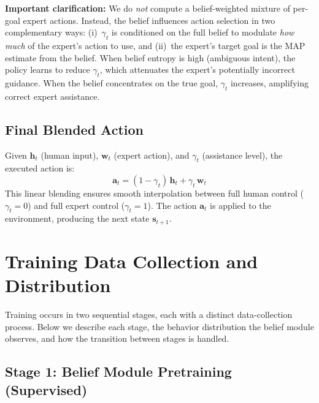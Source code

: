 \documentclass[11pt]{article}
\newcommand{\hvec}{\mathbf{h}_t}
\newcommand{\wvec}{\mathbf{w}_t}
\newcommand{\avec}{\mathbf{a}_t}
\begin{document}
\noindent\textbf{Important clarification:} We do \emph{not} compute a belief-weighted mixture of per-goal expert actions.
Instead, the belief influences action selection in two complementary ways:
(i)~$\gamma_t$ is conditioned on the full belief to modulate \emph{how much} of the expert's action to use, and
(ii)~the expert's target goal is the MAP estimate from the belief.
When belief entropy is high (ambiguous intent), the policy learns to reduce $\gamma_t$, which attenuates the expert's potentially incorrect guidance.
When the belief concentrates on the true goal, $\gamma_t$ increases, amplifying correct expert assistance.


\subsection{Final Blended Action}

Given $\hvec$ (human input), $\wvec$ (expert action), and $\gamma_t$ (assistance level), the executed action is:
\begin{equation}
    \avec = (1 - \gamma_t)\,\hvec + \gamma_t\,\wvec
    \label{eq:blend}
\end{equation}
This linear blending ensures smooth interpolation between full human control ($\gamma_t = 0$) and full expert control ($\gamma_t = 1$).
The action $\avec$ is applied to the environment, producing the next state $\mathbf{s}_{t+1}$.


\section{Training Data Collection and Distribution}
\label{sec:training-data}

Training occurs in two sequential stages, each with a distinct data-collection process.
Below we describe each stage, the behavior distribution the belief module observes, and how the transition between stages is handled.

\subsection{Stage 1: Belief Module Pretraining (Supervised)}
\end{document}
